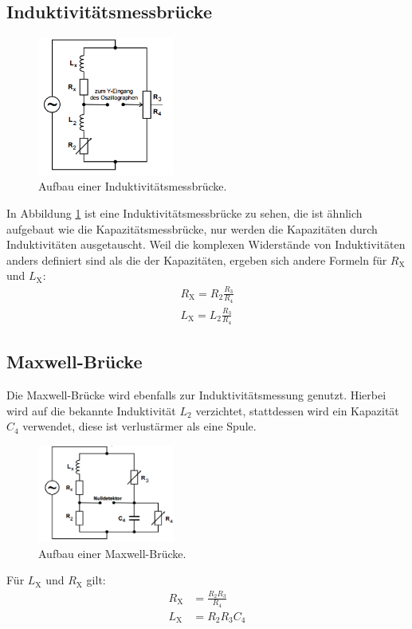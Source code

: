\subsection{Induktivitätsmessbrücke}
\begin{figure}
 \centering
 \includegraphics[width=0.4\textwidth]{induktivitaet.PNG}
 \caption{Aufbau einer Induktivitätsmessbrücke.}
 \label{fig:induktivitaet}
 \end{figure}
 In Abbildung \ref{fig:induktivitaet} ist eine Induktivitätsmessbrücke zu sehen, die ist ähnlich aufgebaut wie die Kapazitätsmessbrücke,
 nur werden die Kapazitäten durch Induktivitäten ausgetauscht.
 Weil die komplexen Widerstände von Induktivitäten anders definiert sind als die der Kapazitäten, ergeben sich andere Formeln für $R_\mathrm{X}$ und $L_\mathrm{X}$:
 \begin{align}
   R_\mathrm{X}=R_\mathrm{2}\frac{R_\mathrm{3}}{R_\mathrm{4}}\\
   L_\mathrm{X}=L_\mathrm{2}\frac{R_\mathrm{3}}{R_\mathrm{4}}
 \end{align}
\subsection{Maxwell-Brücke}
Die Maxwell-Brücke wird ebenfalls zur Induktivitätsmessung genutzt.
Hierbei wird auf die bekannte Induktivität $L_\mathrm{2}$ verzichtet, stattdessen wird ein Kapazität $C_\mathrm{4}$ verwendet, diese ist verlustärmer als eine Spule.
\begin{figure}
 \centering
 \includegraphics[width=0.4\textwidth]{maxwell.PNG}
 \caption{Aufbau einer Maxwell-Brücke.}
 \label{fig:maxwell}
 \end{figure}
Für $L_\mathrm{X}$ und $R_\mathrm{X}$ gilt:
\begin{align}
  R_\mathrm{X}&=\frac{R_\mathrm{2}R_\mathrm{3}}{R_\mathrm{4}}\\
  L_\mathrm{X}&=R_\mathrm{2}R_\mathrm{3}C_\mathrm{4}
\end{align}
